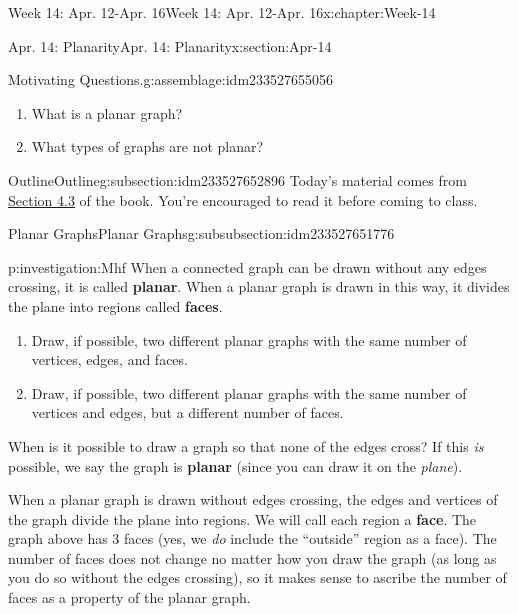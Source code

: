 \documentclass[oneside,10pt,]{book}
\newcommand{\terminology}[1]{\textbf{#1}}
\numberwithin{equation}{section}
\begin{document}
\begin{chapterptx}{Week 14: Apr. 12-Apr. 16}{}{Week 14: Apr. 12-Apr. 16}{}{}{x:chapter:Week-14}
\begin{sectionptx}{Apr. 14: Planarity}{}{Apr. 14: Planarity}{}{}{x:section:Apr-14}
\begin{introduction}{}
\begin{assemblage}{Motivating Questions.}{g:assemblage:idm233527655056}
\begin{enumerate}
\item{}What is a planar graph?%
\item{}What types of graphs are not planar?%
\end{enumerate}
%
\end{assemblage}
\end{introduction}%
%
%
\typeout{************************************************}
\typeout{************************************************}
%
\begin{subsectionptx}{Outline}{}{Outline}{}{}{g:subsection:idm233527652896}
Today's material comes from \href{http://discrete.openmathbooks.org/dmoi3/sec_planar.html}{Section 4.3} of the book. You're encouraged to read it before coming to class.%
%
%
\typeout{************************************************}
\typeout{************************************************}
%
\begin{subsubsectionptx}{Planar Graphs}{}{Planar Graphs}{}{}{g:subsubsection:idm233527651776}
\begin{investigation}{}{p:investigation:Mhf}%
%
%
%
%
When a connected graph can be drawn without any edges crossing, it is called \terminology{planar}. When a planar graph is drawn in this way, it divides the plane into regions called \terminology{faces}.%
\begin{enumerate}
\item{}Draw, if possible, two different planar graphs with the same number of vertices, edges, and faces.%
\item{}Draw, if possible, two different planar graphs with the same number of vertices and edges, but a different number of faces.%
\end{enumerate}
%
\end{investigation}%
 When is it possible to draw a graph so that none of the edges cross? If this \emph{is} possible, we say the graph is \terminology{planar} (since you can draw it on the \emph{plane}).%
\par
{} When a planar graph is drawn without edges crossing, the edges and vertices of the graph divide the plane into regions. We will call each region a \terminology{face}. The graph above has 3 faces (yes, we \emph{do} include the ``outside'' region as a face). The number of faces does not change no matter how you draw the graph (as long as you do so without the edges crossing), so it makes sense to ascribe the number of faces as a property of the planar graph.%

\end{subsubsectionptx}
\end{subsectionptx}
\end{sectionptx}
\end{chapterptx}
\end{document}
